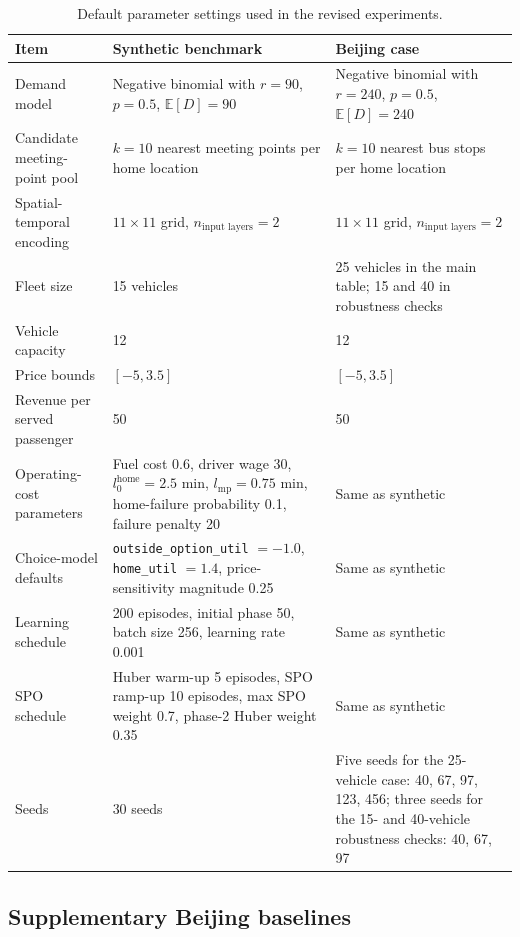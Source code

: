 \documentclass[preprint,12pt,authoryear]{elsarticle}
\begin{document}
\begin{table}[t]
\centering
\caption{Default parameter settings used in the revised experiments.}
\label{tab:d1}
\footnotesize
\begin{tabularx}{\textwidth}{lYY}
\toprule
Item & Synthetic benchmark & Beijing case \\
\midrule
Demand model & Negative binomial with $r=90$, $p=0.5$, $\mathbb{E}[D]=90$ & Negative binomial with $r=240$, $p=0.5$, $\mathbb{E}[D]=240$ \\
Candidate meeting-point pool & $k=10$ nearest meeting points per home location & $k=10$ nearest bus stops per home location \\
Spatial-temporal encoding & $11\times 11$ grid, $n_{\text{input layers}}=2$ & $11\times 11$ grid, $n_{\text{input layers}}=2$ \\
Fleet size & 15 vehicles & 25 vehicles in the main table; 15 and 40 in robustness checks \\
Vehicle capacity & 12 & 12 \\
Price bounds & $[-5,3.5]$ & $[-5,3.5]$ \\
Revenue per served passenger & 50 & 50 \\
Operating-cost parameters & Fuel cost 0.6, driver wage 30, $l_0^{\mathrm{home}}=2.5$ min, $l_{\mathrm{mp}}=0.75$ min, home-failure probability 0.1, failure penalty 20 & Same as synthetic \\
Choice-model defaults & \texttt{outside\_option\_util} $=-1.0$, \texttt{home\_util} $=1.4$, price-sensitivity magnitude 0.25 & Same as synthetic \\
Learning schedule & 200 episodes, initial phase 50, batch size 256, learning rate 0.001 & Same as synthetic \\
SPO schedule & Huber warm-up 5 episodes, SPO ramp-up 10 episodes, max SPO weight 0.7, phase-2 Huber weight 0.35 & Same as synthetic \\
Seeds & 30 seeds & Five seeds for the 25-vehicle case: 40, 67, 97, 123, 456; three seeds for the 15- and 40-vehicle robustness checks: 40, 67, 97 \\
\bottomrule
\end{tabularx}
\end{table}

\subsection{Supplementary Beijing baselines}
\end{document}
